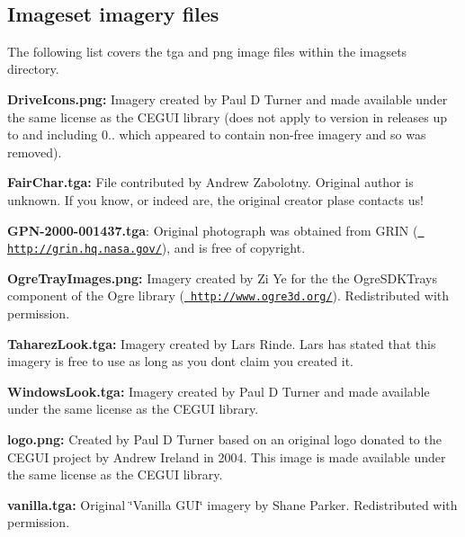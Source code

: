 ~\newline
 \hypertarget{datafile_licensing_data_lic_imagesets}{}\subsection{Imageset imagery files}\label{datafile_licensing_data_lic_imagesets}
The following list covers the tga and png image files within the imagsets directory.
\begin{DoxyItemize}
\item {\bfseries{Drive\+Icons.\+png\+:}} Imagery created by Paul D Turner and made available under the same license as the C\+E\+G\+UI library (does not apply to version in releases up to and including 0.. which appeared to contain non-\/free imagery and so was removed).
\item {\bfseries{Fair\+Char.\+tga\+:}} File contributed by Andrew Zabolotny. Original author is unknown. If you know, or indeed are, the original creator plase contacts us!
\item {\bfseries{G\+P\+N-\/2000-\/001437.\+tga}}\+: Original photograph was obtained from G\+R\+IN (\href{http://grin.hq.nasa.gov/}{\texttt{ http\+://grin.\+hq.\+nasa.\+gov/}}), and is free of copyright.
\item {\bfseries{Ogre\+Tray\+Images.\+png\+:}} Imagery created by Zi Ye for the the Ogre\+S\+D\+K\+Trays component of the Ogre library (\href{http://www.ogre3d.org/}{\texttt{ http\+://www.\+ogre3d.\+org/}}). Redistributed with permission.
\item {\bfseries{Taharez\+Look.\+tga\+:}} Imagery created by Lars Rinde. Lars has stated that this imagery is free to use as long as you don\textquotesingle{}t claim you created it.
\item {\bfseries{Windows\+Look.\+tga\+:}} Imagery created by Paul D Turner and made available under the same license as the C\+E\+G\+UI library.
\item {\bfseries{logo.\+png\+:}} Created by Paul D Turner based on an original logo donated to the C\+E\+G\+UI project by Andrew Ireland in 2004. This image is made available under the same license as the C\+E\+G\+UI library.
\item {\bfseries{vanilla.\+tga\+:}} Original \char`\"{}\+Vanilla G\+U\+I\char`\"{} imagery by Shane Parker. Redistributed with permission.
\end{DoxyItemize}

